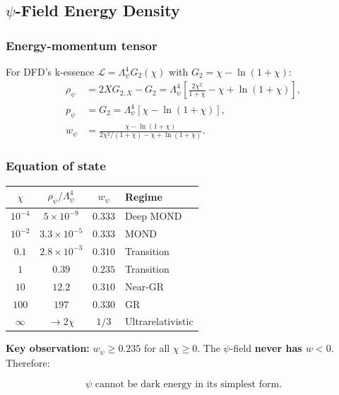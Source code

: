 \documentclass[11pt,a4paper]{article}
\begin{document}
\subsection{$\psi$-Field Energy Density}

\subsubsection{Energy-momentum tensor}

For DFD's k-essence $\mathcal{L} = \Lambda_\psi^4 G_2(\chi)$ with $G_2 = \chi - \ln(1+\chi)$:
\begin{align}
\rho_\psi &= 2X G_{2,X} - G_2 = \Lambda_\psi^4\left[\frac{2\chi^2}{1+\chi} - \chi + \ln(1+\chi)\right], \label{eq:rho-psi}\\
p_\psi &= G_2 = \Lambda_\psi^4\left[\chi - \ln(1+\chi)\right], \label{eq:p-psi}\\
w_\psi &= \frac{\chi - \ln(1+\chi)}{2\chi^2/(1+\chi) - \chi + \ln(1+\chi)}. \label{eq:w-psi}
\end{align}

\subsubsection{Equation of state}

\begin{center}
\begin{tabular}{cccl}
\toprule
$\chi$ & $\rho_\psi/\Lambda_\psi^4$ & $w_\psi$ & \textbf{Regime} \\
\midrule
$10^{-4}$ & $5 \times 10^{-9}$ & $0.333$ & Deep MOND \\
$10^{-2}$ & $3.3 \times 10^{-5}$ & $0.333$ & MOND \\
$0.1$ & $2.8 \times 10^{-3}$ & $0.310$ & Transition \\
$1$ & $0.39$ & $0.235$ & Transition \\
$10$ & $12.2$ & $0.310$ & Near-GR \\
$100$ & $197$ & $0.330$ & GR \\
$\infty$ & $\to 2\chi$ & $1/3$ & Ultrarelativistic \\
\bottomrule
\end{tabular}
\end{center}

\textbf{Key observation:} $w_\psi \geq 0.235$ for all $\chi \geq 0$. The $\psi$-field \textbf{never has $w < 0$}. Therefore:

\begin{equation}
\boxed{\psi \text{ cannot be dark energy in its simplest form.}}
\end{equation}
\end{document}
